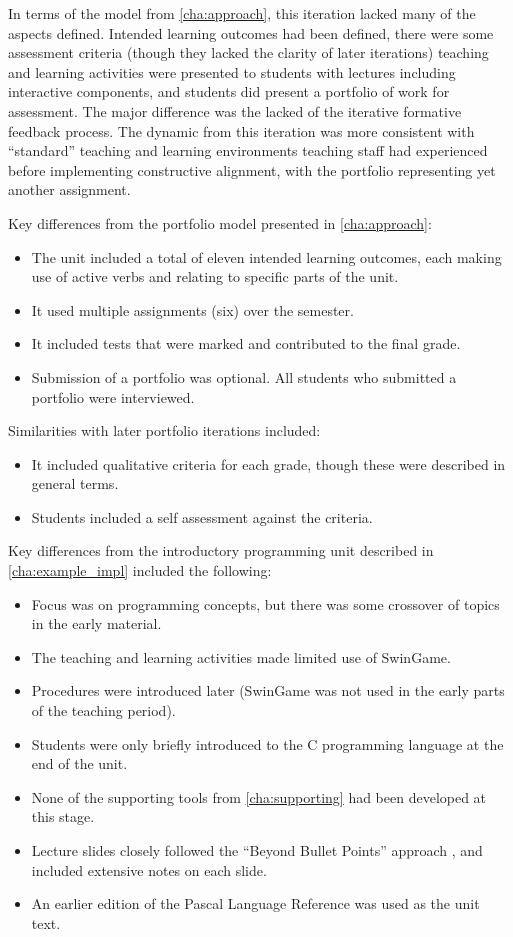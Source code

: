 In terms of the model from \cref{cha:approach}, this iteration lacked many of the aspects defined. Intended learning outcomes had been defined, there were some assessment criteria (though they lacked the clarity of later iterations) teaching and learning activities were presented to students with lectures including interactive components, and students did present a portfolio of work for assessment. The major difference was the lacked of the iterative formative feedback process. The dynamic from this iteration was more consistent with ``standard'' teaching and learning environments teaching staff had experienced before implementing constructive alignment, with the portfolio representing yet another assignment.

Key differences from the portfolio model presented in \cref{cha:approach}:
\begin{itemize}[noitemsep,nolistsep]
  \item The unit included a total of eleven intended learning outcomes, each making use of active verbs and relating to specific parts of the unit.
  \item It used multiple assignments (six) over the semester.
  \item It included tests that were marked and contributed to the final grade.
  \item Submission of a portfolio was optional.  All students who submitted a portfolio were interviewed.
\end{itemize}

Similarities with later portfolio iterations included:
\begin{itemize}[noitemsep,nolistsep]
  \item It included qualitative criteria for each grade, though these were described in general terms.
  \item Students included a self assessment against the criteria.
\end{itemize}

Key differences from the introductory programming unit described in \cref{cha:example_impl} included the following:
\begin{itemize}[noitemsep,nolistsep]
	\item Focus was on programming concepts, but there was some crossover of topics in the early material.
	\item The teaching and learning activities made limited use of SwinGame.
	\item Procedures were introduced later (SwinGame was not used in the early parts of the teaching period). 
	\item Students were only briefly introduced to the C programming language at the end of the unit.
	\item None of the supporting tools from \cref{cha:supporting} had been developed at this stage.
	\item Lecture slides closely followed the ``Beyond Bullet Points'' approach \cite{Atkinson:2007}, and included extensive notes on each slide.
	\item An earlier edition of the Pascal Language Reference \cite{FPC:2013lang} was used as the unit text.
\end{itemize}

